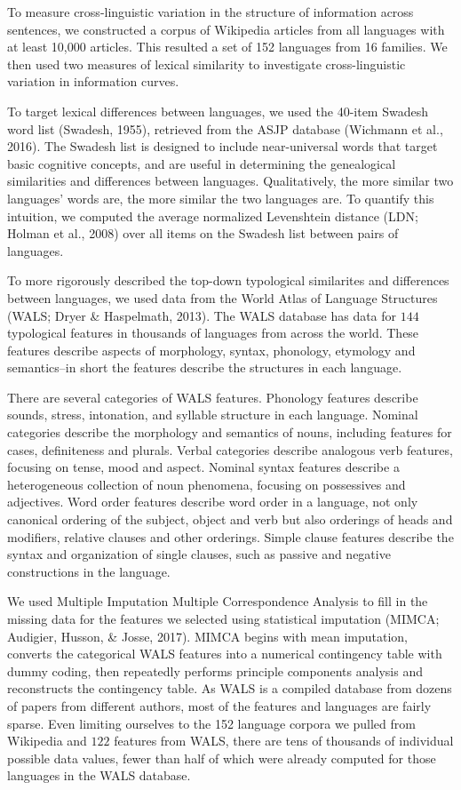 \documentclass[
  english,
  man,floatsintext]{apa6}
\begin{document}
To measure cross-linguistic variation in the structure of information across sentences, we constructed a corpus of Wikipedia articles from all languages with at least 10,000 articles. This resulted a set of 152 languages from 16 families. We then used two measures of lexical similarity to investigate cross-linguistic variation in information curves.

To target lexical differences between languages, we used the 40-item Swadesh word list (Swadesh, 1955), retrieved from the ASJP database (Wichmann et al., 2016). The Swadesh list is designed to include near-universal words that target basic cognitive concepts, and are useful in determining the genealogical similarities and differences between languages. Qualitatively, the more similar two languages' words are, the more similar the two languages are. To quantify this intuition, we computed the average normalized Levenshtein distance (LDN; Holman et al., 2008) over all items on the Swadesh list between pairs of languages.

To more rigorously described the top-down typological similarites and differences between languages, we used data from the World Atlas of Language Structures (WALS; Dryer \& Haspelmath, 2013). The WALS database has data for \(144\) typological features in thousands of languages from across the world. These features describe aspects of morphology, syntax, phonology, etymology and semantics--in short the features describe the structures in each language.

There are several categories of WALS features. Phonology features describe sounds, stress, intonation, and syllable structure in each language. Nominal categories describe the morphology and semantics of nouns, including features for cases, definiteness and plurals. Verbal categories describe analogous verb features, focusing on tense, mood and aspect. Nominal syntax features describe a heterogeneous collection of noun phenomena, focusing on possessives and adjectives. Word order features describe word order in a language, not only canonical ordering of the subject, object and verb but also orderings of heads and modifiers, relative clauses and other orderings. Simple clause features describe the syntax and organization of single clauses, such as passive and negative constructions in the language.

We used Multiple Imputation Multiple Correspondence Analysis to fill in the missing data for the features we selected using statistical imputation (MIMCA; Audigier, Husson, \& Josse, 2017). MIMCA begins with mean imputation, converts the categorical WALS features into a numerical contingency table with dummy coding, then repeatedly performs principle components analysis and reconstructs the contingency table. As WALS is a compiled database from dozens of papers from different authors, most of the features and languages are fairly sparse. Even limiting ourselves to the 152 language corpora we pulled from Wikipedia and \(122\) features from WALS, there are tens of thousands of individual possible data values, fewer than half of which were already computed for those languages in the WALS database.
\end{document}
